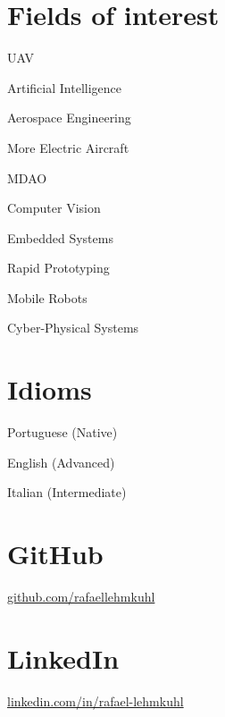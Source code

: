 \documentclass[A4]{deedy-resume} %
\begin{document}

\newpage %

\begin{minipage}[t]{0.32\textwidth} %
\section{Fields of interest}
\vspace{\topsep} %
\begin{tightitemize}
\item UAV
\item Artificial Intelligence
\item Aerospace Engineering
\item More Electric Aircraft
\item MDAO
\item Computer Vision
\item Embedded Systems
\item Rapid Prototyping
\item Mobile Robots
\item Cyber-Physical Systems
\end{tightitemize}

\vspace*{0.2cm}

\section{Idioms}
\vspace{\topsep} %
\begin{tightitemize}
\item Portuguese (Native)
\item English (Advanced)
\item Italian (Intermediate)
\end{tightitemize}

\vspace*{0.2cm}

\section{GitHub}
\href{https://github.com/rafaellehmkuhl}{github.com/rafaellehmkuhl}

\vspace*{0.2cm}

\section{LinkedIn}
\href{https://www.linkedin.com/in/rafael-lehmkuhl/}{linkedin.com/in/rafael-lehmkuhl}


\end{minipage} %
\end{document}
